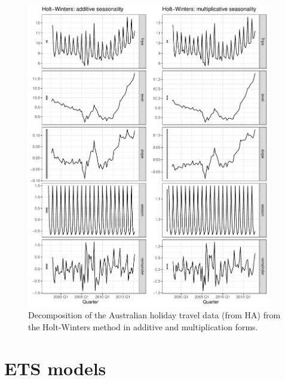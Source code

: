 \documentclass{article}
\begin{document}
\begin{itemize}
\begin{figure}[p]
\centering
\includegraphics[width=0.95\textwidth]{fig/decomposition-1.pdf}
\caption{Decomposition of the Australian holiday travel data (from HA) from the
  Holt-Winters method in additive and multiplication forms.}    
\label{fig:decomposition}
\end{figure}
\end{itemize}

\section{ETS models}
\end{document}
